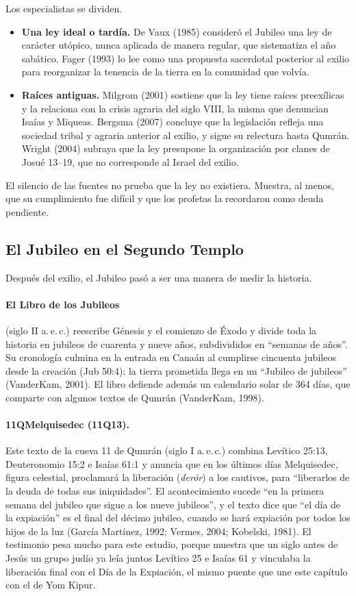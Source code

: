 \documentclass[11pt,letterpaper]{article}
\begin{document}
Los especialistas se dividen.
\begin{itemize}\setlength{\itemsep}{1pt}
\item \textbf{Una ley ideal o tardía.} De Vaux (1985) consideró el Jubileo una ley de carácter utópico, nunca aplicada de manera regular, que sistematiza el año sabático. Fager (1993) lo lee como una propuesta sacerdotal posterior al exilio para reorganizar la tenencia de la tierra en la comunidad que volvía.
\item \textbf{Raíces antiguas.} Milgrom (2001) sostiene que la ley tiene raíces preexílicas y la relaciona con la crisis agraria del siglo VIII, la misma que denuncian Isaías y Miqueas. Bergsma (2007) concluye que la legislación refleja una sociedad tribal y agraria anterior al exilio, y sigue su relectura hasta Qumrán. Wright (2004) subraya que la ley presupone la organización por clanes de Josué 13--19, que no corresponde al Israel del exilio.
\end{itemize}
El silencio de las fuentes no prueba que la ley no existiera. Muestra, al menos, que su cumplimiento fue difícil y que los profetas la recordaron como deuda pendiente.

\subsection{El Jubileo en el Segundo Templo}
Después del exilio, el Jubileo pasó a ser una manera de medir la historia.

\paragraph{El Libro de los Jubileos} (siglo II a.\,e.\,c.) reescribe Génesis y el comienzo de Éxodo y divide toda la historia en jubileos de cuarenta y nueve años, subdivididos en ``semanas de años''. Su cronología culmina en la entrada en Canaán al cumplirse cincuenta jubileos desde la creación (Jub 50:4): la tierra prometida llega en un ``Jubileo de jubileos'' (VanderKam, 2001). El libro defiende además un calendario solar de 364 días, que comparte con algunos textos de Qumrán (VanderKam, 1998).

\paragraph{11QMelquisedec (11Q13).} Este texto de la cueva 11 de Qumrán (siglo I a.\,e.\,c.) combina Levítico 25:13, Deuteronomio 15:2 e Isaías 61:1 y anuncia que en los últimos días Melquisedec, figura celestial, proclamará la liberación (\emph{derór}) a los cautivos, para ``liberarlos de la deuda de todas sus iniquidades''. El acontecimiento sucede ``en la primera semana del jubileo que sigue a los nueve jubileos'', y el texto dice que ``el día de la expiación'' es el final del décimo jubileo, cuando se hará expiación por todos los hijos de la luz (García Martínez, 1992; Vermes, 2004; Kobelski, 1981). El testimonio pesa mucho para este estudio, porque muestra que un siglo antes de Jesús un grupo judío ya leía juntos Levítico 25 e Isaías 61 y vinculaba la liberación final con el Día de la Expiación, el mismo puente que une este capítulo con el de Yom Kipur.
\end{document}
